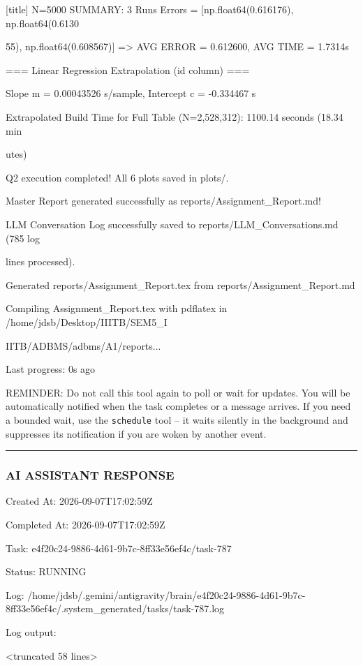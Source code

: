 \documentclass[11pt,a4paper]{article}
\begin{document}
[title] N=5000 SUMMARY: 3 Runs Errors = [np.float64(0.616176), np.float64(0.6130

55), np.float64(0.608567)] => AVG ERROR = 0.612600, AVG TIME = 1.7314s

=== Linear Regression Extrapolation (id column) ===

Slope m = 0.00043526 s/sample, Intercept c = -0.334467 s

Extrapolated Build Time for Full Table (N=2,528,312): 1100.14 seconds (18.34 min

utes)

Q2 execution completed! All 6 plots saved in plots/.

Master Report generated successfully as reports/Assignment\_Report.md!

LLM Conversation Log successfully saved to reports/LLM\_Conversations.md (785 log

lines processed).

Generated reports/Assignment\_Report.tex from reports/Assignment\_Report.md

Compiling Assignment\_Report.tex with pdflatex in /home/jdsb/Desktop/IIITB/SEM5\_I

IITB/ADBMS/adbms/A1/reports...


Last progress: 0s ago



REMINDER: Do not call this tool again to poll or wait for updates. You will be automatically notified when the task completes or a message arrives. If you need a bounded wait, use the \texttt{schedule} tool -- it waits silently in the background and suppresses its notification if you are woken by another event.


\hrule

\subsubsection{AI ASSISTANT RESPONSE}

Created At: 2026-09-07T17:02:59Z

Completed At: 2026-09-07T17:02:59Z

Task: e4f20c24-9886-4d61-9b7c-8ff33e56ef4c/task-787

Status: RUNNING

Log: /home/jdsb/.gemini/antigravity/brain/e4f20c24-9886-4d61-9b7c-8ff33e56ef4c/.system\_generated/tasks/task-787.log

Log output:

<truncated 58 lines>
\end{document}
